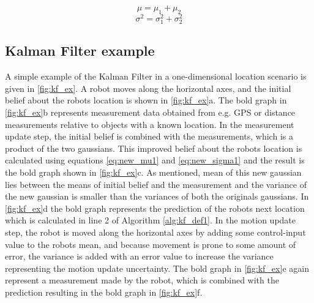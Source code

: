 \begin{equation}
\label{eq:new_mu2}
\mu = \mu_{1} + \mu_{2}
\end{equation}
\begin{equation}
\label{eq:new_sigma2}
\sigma^2 = \sigma_{1}^2 + \sigma_{2}^2
\end{equation}

\subsection{Kalman Filter example}

A simple example of the Kalman Filter in a one-dimensional location scenario is given in \autoref{fig:kf_ex}. A robot moves along the horizontal axes, and the initial belief about the robots location is shown in \autoref{fig:kf_ex}a. The bold graph in \autoref{fig:kf_ex}b represents measurement data obtained from e.g. GPS or distance measurements relative to objects with a known location. In the measurement update step, the initial belief is combined with the measurements, which is a product of the two gaussians. This improved belief about the robots location is calculated using equations \ref{eq:new_mu1} and \ref{eq:new_sigma1} and the result is the bold graph shown in \autoref{fig:kf_ex}c. As mentioned, mean of this new gaussian lies between the means of initial belief and the measurement and the variance of the new gaussian is smaller than the variances of both the originals gaussians. In \autoref{fig:kf_ex}d the bold graph represents the prediction of the robots next location which is calculated in line 2 of Algorithm \ref{alg:kf_def1}.
In the motion update step, the robot is moved along the horizontal axes by adding some control-input value to the robots mean, and because movement is prone to some amount of error, the variance is added with an error value to increase the variance representing the motion update uncertainty. The bold graph in \autoref{fig:kf_ex}e again represent a measurement made by the robot, which is combined with the prediction resulting in the bold graph in \autoref{fig:kf_ex}f.

